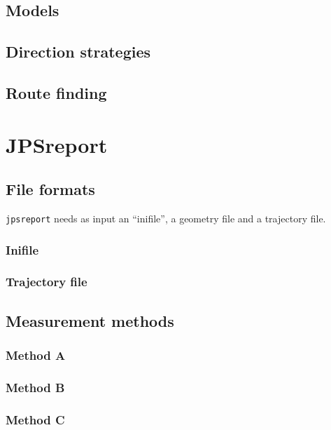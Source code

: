 \documentclass[%
paper=A4,					%
twoside=true,				%
openright,					%
parskip=full,				%
chapterprefix=true,			%
11pt,						%
headings=normal,			%
bibliography=totoc,			%
listof=totoc,				%
titlepage=on,				%
captions=tableabove,		%
draft=false,				%
]{scrreprt}%
\begin{document}
\section{Models}

\newpage
\section{Direction strategies}

\newpage
\section{Route finding}

\chapter{JPSreport}
\section{File formats}
\texttt{jpsreport} needs as input an ``inifile'', a geometry file and a trajectory file.

\subsection{Inifile}

\newpage
\subsection{Trajectory file}

\newpage
\section{Measurement methods}
\subsection{Method A}

\newpage
\subsection{Method B}

\newpage
\subsection{Method C}

\newpage
\end{document}
